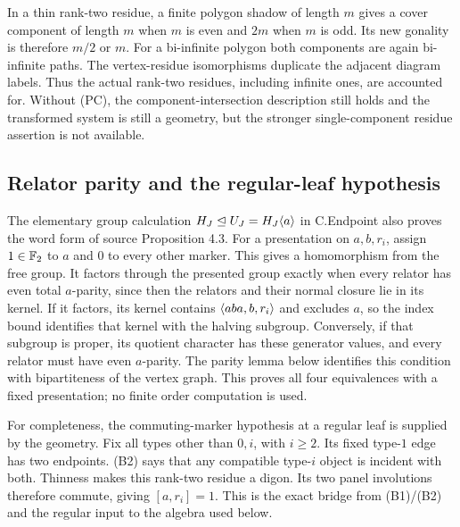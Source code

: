 In a thin rank-two residue, a finite polygon shadow of length $m$
gives a cover component of length $m$ when $m$ is even and $2m$
when $m$ is odd. Its new gonality is therefore $m/2$ or $m$.
For a bi-infinite polygon both components are again bi-infinite paths.
The vertex-residue isomorphisms duplicate the adjacent diagram labels.
Thus the actual rank-two residues, including infinite ones, are
accounted for. Without (PC), the component-intersection description
still holds and the transformed system is still a geometry, but the
stronger single-component residue assertion is not available.

\subsection{Relator parity and the regular-leaf hypothesis}
The elementary group calculation $H_J\trianglelefteq U_J=H_J\langle a\rangle$
in C.Endpoint also proves the word form of source Proposition 4.3.
For a presentation on $a,b,r_i$, assign $1\in\mathbb F_2$ to $a$ and
$0$ to every other marker. This gives a homomorphism from the free
group. It factors through the presented group exactly when every
relator has even total $a$-parity, since then the relators and their
normal closure lie in its kernel. If it factors, its kernel contains
$\langle aba,b,r_i\rangle$ and excludes $a$, so the index bound identifies
that kernel with the halving subgroup. Conversely, if that subgroup
is proper, its quotient character has these generator values, and
every relator must have even $a$-parity. The parity lemma below
identifies this condition with bipartiteness of the vertex graph.
This proves all four equivalences with a fixed presentation; no
finite order computation is used.

For completeness, the commuting-marker hypothesis at a regular leaf
is supplied by the geometry. Fix all types other than $0,i$, with
$i\ge2$. Its fixed type-$1$ edge has two endpoints. (B2) says that
any compatible type-$i$ object is incident with both. Thinness makes
this rank-two residue a digon. Its two panel involutions therefore
commute, giving $[a,r_i]=1$. This is the exact bridge from (B1)/(B2)
and the regular input to the algebra used below.
